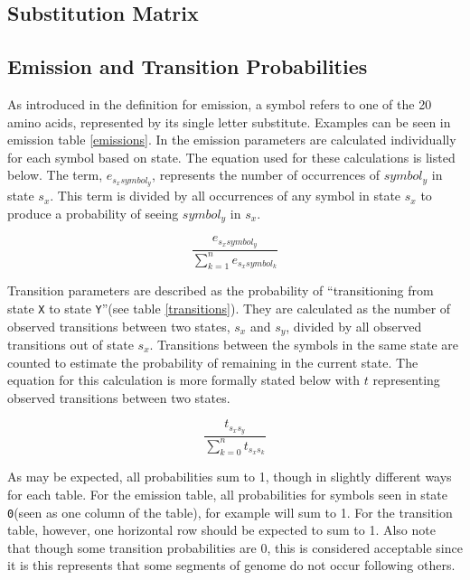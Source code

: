 \documentclass[a4paper,11pt]{article}
\begin{document}
\subsection{Substitution Matrix}





\subsection{Emission and Transition Probabilities}

As introduced in the definition for emission, a symbol refers to one of the 20 amino acids, represented by its single letter substitute. Examples can be seen in emission table \ref{emissions}. In the emission parameters are calculated individually for each symbol based on state. The equation used for these calculations is listed below. The term, $e_{s_{x}symbol_y}$, represents the number of occurrences of $symbol_y$ in state $s_x$. This term is divided by all occurrences of any symbol in state $s_x$ to produce a probability of seeing $symbol_y$ in $s_x$.

\begin{equation}
    \frac{e_{s_{x}symbol_y}}{\sum_{k=1}^n e_{s_xsymbol_k}}
\end{equation}


Transition parameters are described as the probability of ``transitioning from state \verb+X+ to state \verb+Y+''(see table \ref{transitions}). They are calculated as the number of observed transitions between two states, $s_x$ and $s_y$, divided by all observed transitions out of state $s_x$. Transitions between the symbols in the same state are counted to estimate the probability of remaining in the current state. The equation for this calculation is more formally stated below with $t$ representing observed transitions between two states.

\begin{equation}
    \frac{t_{s_{x}s_{y}}}{\sum_{k = 0}^{n} t_{s_{x}s_{k}}}
\end{equation}

As may be expected, all probabilities sum to 1, though in slightly different ways for each table. For the emission table, all probabilities for symbols seen in state \verb+0+(seen as one column of the table), for example will sum to 1. For the transition table, however, one horizontal row should be expected to sum to 1. Also note that though some transition probabilities are 0, this is considered acceptable since it is this represents that some segments of genome do not occur following others.
\end{document}
